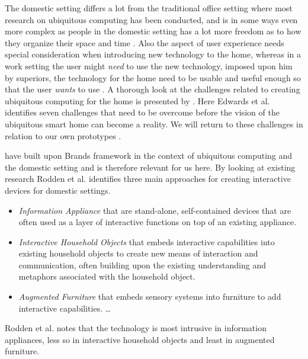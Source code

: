 The domestic setting differs a lot from the traditional office setting where most research on ubiquitous computing has been conducted, and is in some ways even more complex as people in the domestic setting has a lot more freedom as to how they organize their space and time \cite{meyer2003survey}.
Also the aspect of user experience needs special consideration when introducing new technology to the home, whereas in a work setting the user might \emph{need} to use the new technology, imposed upon him by superiors, the technology for the home need to be usable and useful enough so that the user \emph{wants} to use \citep{meyer2003survey}.
A thorough look at the challenges related to creating ubiquitous computing for the home is presented by \citet{edwards2001home}.
Here Edwards et al. identifies seven challenges that need to be overcome before the vision of the ubiquitous smart home can become a reality. We will return to these challenges in relation to our own prototypes .

\citet{rodden2003evolution} have built upon Brands framework in the context of ubiquitous computing and the domestic setting and is therefore relevant for us here.
By looking at existing research Rodden et al. identifies three main approaches for creating interactive devices for domestic settings.

\begin{itemize}
  \item \emph{Information Appliance} that are stand-alone, self-contained devices that are often used as a layer of interactive functions on top of an existing appliance.
  \item \emph{Interactive Household Objects} that embeds interactive capabilities into existing household objects to create new means of interaction and communication, often building upon the existing understanding and metaphors associated with the household object.
  \item \emph{Augmented Furniture} that embeds sensory systems into furniture to add interactive capabilities. \ldots
\end{itemize}

Rodden et al. notes that the technology is most intrusive in information appliances, less so in interactive household objects and least in augmented furniture.



